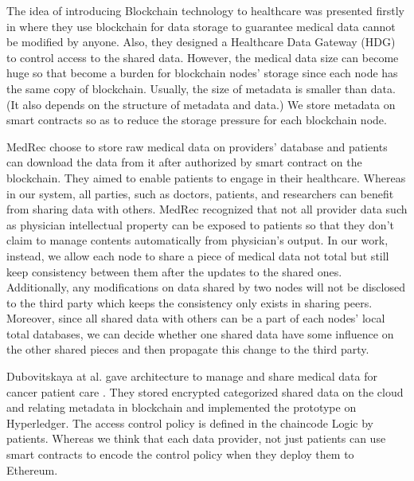 \documentclass[conference]{IEEEtran}
\begin{document}
The idea of introducing Blockchain technology to healthcare was presented firstly in \cite{yue2016healthcare} where they use blockchain for data storage to guarantee medical data cannot be modified by anyone. Also, they designed a Healthcare Data Gateway (HDG) to control access to the shared data. However, the medical data size can become huge so that become a burden for blockchain nodes' storage since each node has the same copy of blockchain. Usually, the size of metadata is smaller than data. (It also depends on the structure of metadata and data.) We store metadata on smart contracts so as to reduce the storage pressure for each blockchain node.

MedRec \cite{azaria2016medrec} choose to store raw medical data on providers' database and patients can download the data from it after authorized by smart contract on the blockchain. They aimed to enable patients to engage in their healthcare. Whereas in our system, all parties, such as doctors, patients, and researchers can benefit from sharing data with others. MedRec recognized that not all provider data such as physician intellectual property can be exposed to patients \cite{us2017individuals, grossman2011clinical} so that they don't claim to manage contents automatically from physician's output. In our work, instead, we allow each node to share a piece of medical data not total but still keep consistency between them after the updates to the shared ones. Additionally, any modifications on data shared by two nodes will not be disclosed to the third party which keeps the consistency only exists in sharing peers. Moreover, since all shared data with others can be a part of each nodes' local total databases, we can decide whether one shared data have some influence on the other shared pieces and then propagate this change to the third party.

Dubovitskaya at al. gave architecture to manage and share medical data for cancer patient care \cite{dubovitskaya2017secure}. They stored encrypted categorized shared data on the cloud and relating metadata in blockchain and implemented the prototype on Hyperledger\cite{hyperledger2017hyperledger}. The access control policy is defined in the chaincode Logic by patients. Whereas we think that each data provider, not just patients can use smart contracts to encode the control policy when they deploy them to Ethereum. 
\end{document}
